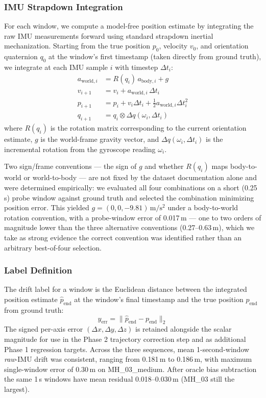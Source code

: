 \subsubsection{IMU Strapdown Integration}
For each window, we compute a model-free position estimate by
integrating the raw IMU measurements forward using standard strapdown
inertial mechanization. Starting from the true position $p_0$, velocity
$v_0$, and orientation quaternion $q_0$ at the window's first timestamp
(taken directly from ground truth), we integrate at each IMU sample
$i$ with timestep $\Delta t_i$:
\begin{align}
  a_{\text{world},i} &= R(q_i)\, a_{\text{body},i} + g \\
  v_{i+1} &= v_i + a_{\text{world},i}\, \Delta t_i \\
  p_{i+1} &= p_i + v_i \Delta t_i + \tfrac{1}{2} a_{\text{world},i} \Delta t_i^2 \\
  q_{i+1} &= q_i \otimes \Delta q(\omega_i, \Delta t_i)
\end{align}
where $R(q_i)$ is the rotation matrix corresponding to the current
orientation estimate, $g$ is the world-frame gravity vector, and
$\Delta q(\omega_i, \Delta t_i)$ is the incremental rotation from the
gyroscope reading $\omega_i$.

Two sign/frame conventions — the sign of $g$ and whether $R(q_i)$ maps
body-to-world or world-to-body — are not fixed by the dataset
documentation alone and were determined empirically: we evaluated all
four combinations on a short (0.25\,s) probe window against ground
truth and selected the combination minimizing position error. This
yielded $g = (0,0,-9.81)\,\mathrm{m/s^2}$ under a body-to-world rotation
convention, with a probe-window error of 0.017\,m — one to two orders of
magnitude lower than the three alternative conventions (0.27–0.63\,m),
which we take as strong evidence the correct convention was identified
rather than an arbitrary best-of-four selection.

\subsubsection{Label Definition}
The drift label for a window is the Euclidean distance between the
integrated position estimate $\hat{p}_{\text{end}}$ at the window's final
timestamp and the true position $p_{\text{end}}$ from ground truth:
\begin{equation}
  y_{\text{err}} = \lVert \hat{p}_{\text{end}} - p_{\text{end}} \rVert_2
\end{equation}
The signed per-axis error $(\Delta x, \Delta y, \Delta z)$ is retained
alongside the scalar magnitude for use in the Phase 2 trajectory
correction step and as additional Phase 1 regression targets. Across the
three sequences, mean 1-second-window \emph{raw}-IMU drift was consistent,
ranging from 0.181\,m to 0.186\,m, with maximum single-window error of
0.30\,m on MH\_03\_medium. After oracle bias subtraction the same 1\,s
windows have mean residual 0.018--0.030\,m (MH\_03 still the largest).

